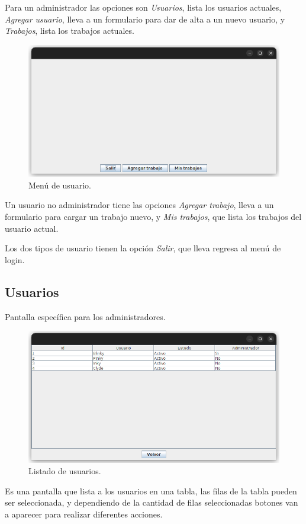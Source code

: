 \documentclass{article}
\begin{document}
Para un administrador las opciones son \emph{Usuarios}, lista los usuarios actuales, \emph{Agregar usuario}, lleva a un formulario para dar de alta a un nuevo usuario, y \emph{Trabajos}, lista los trabajos actuales.

\newpage

\begin{figure}[h]
    \centering
    \includegraphics[width=0.7\linewidth,keepaspectratio]{menu-user.png}
    \caption{Menú de usuario.}
\end{figure}

Un usuario no administrador tiene las opciones \emph{Agregar trabajo}, lleva a un formulario para cargar un trabajo nuevo, y \emph{Mis trabajos}, que lista los trabajos del usuario actual.

Los dos tipos de usuario tienen la opción \emph{Salir}, que lleva regresa al menú de login.

\subsection{Usuarios}

Pantalla específica para los administradores.

\begin{figure}[h]
    \centering
    \includegraphics[width=0.7\linewidth,keepaspectratio]{list-users.png}
    \caption{Listado de usuarios.}
\end{figure}

Es una pantalla que lista a los usuarios en una tabla, las filas de la tabla pueden ser seleccionada, y dependiendo de la cantidad de filas seleccionadas botones van a aparecer para realizar diferentes acciones.
\end{document}
